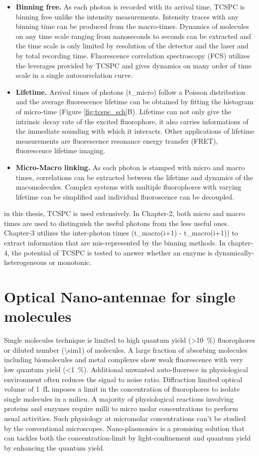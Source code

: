 \documentclass[11pt,a4paper,onecolumn]{article}
\begin{document}
\begin{itemize}
	\item \textbf{Binning free.} As each photon is recorded with its arrival time, TCSPC is binning free unlike the intensity measurements.
	Intensity traces with any binning time can be produced from the macro-times.
	Dynamics of molecules on any time scale ranging from nanoseconds to seconds can be extracted and the time scale is only limited by resolution of the detector and the laser and by total recording time.
	Fluorescence correlation spectroscopy (FCS) utilizes the leverages provided by TCSPC and gives dynamics on many order of time scale in a single autocorrelation curve.
	\item \textbf{Lifetime.} Arrival times of photons (t\_micro) follow a Poisson distribution and the average fluorescence lifetime can be obtained by fitting the histogram of micro-time (Figure \ref{fig:tcspc_sch}B).
	Lifetime can not only give the intrinsic decay rate of the excited fluorophore, it also carries informations of the immediate sounding with which it interacts.
	Other applications of lifetime measurements are fluorescence resonance energy transfer (FRET), fluorescence lifetime imaging.\cite{selvin2000the,lakowicz1992fluorescence} 
	\item \textbf{Micro-Macro linking.} As each photon is stamped with micro and macro times, correlations can be extracted between the lifetime and dynamics of the macomolecules.
	Complex systems with multiple fluorophores with varying lifetime can be simplified and individual fluoroscence can be decoupled.
\end{itemize}
in this thesis, TCSPC is used extensively.
In Chapter-2, both micro and macro times are used to distinguish the useful photons from the less useful ones.
Chapter-3 utilizes the inter-photon times (t\_macro(i+1) - t\_macro(i+1)) to extract information that are mis-represented by the binning methods.
In chapter-4, the potential of TCSPC is tested to answer whether an enzyme is dynamically-heterogeneous or monotonic. 
%
\section{Optical Nano-antennae for single molecules}
Single molecules technique is limited to high quantum yield (\SI{>10}{\percent}) fluorophores or diluted number (\SI{\sim1}{\nM}) of molecules.
A large fraction of absorbing molecules including biomolecules and metal complexes show weak fluorescence with very low quantum yield (\SI{<1}{\percent}).
Additional unwanted auto-fluoresce in physiological environment often reduces the signal to noise ratio.
Diffraction limited optical volume of \SI{1}{fL} imposes a limit in the concentration of fluorophores to isolate single molecules in a milieu.
A majority of physiological reactions involving proteins and enzymes require milli to micro molar concentrations to perform usual activities.\cite{craighead2006future,punj2013gold,fabrizio2016roadmap,punj2014thesis}
Such physiology at micromolar concentrations can't be studied by the conventional microscopes.
Nano-plasmonics is a promising solution that can tackles both the concentration-limit by light-confinement and quantum yield by enhancing the quantum yield.
\end{document}
